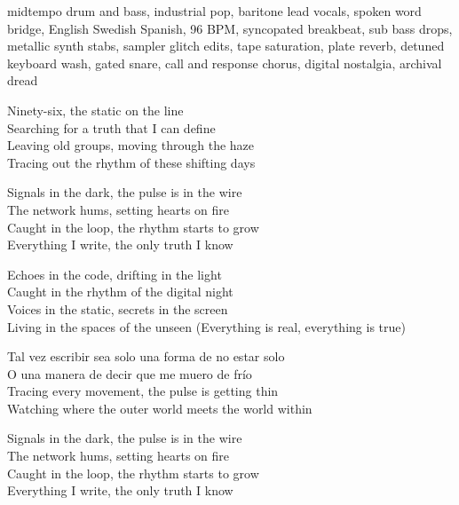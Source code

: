 

\begin{notes}
\end{notes}

\begin{style}
midtempo drum and bass, industrial pop, baritone lead vocals, spoken word bridge, English Swedish Spanish, 96 BPM, syncopated breakbeat, sub bass drops, metallic synth stabs, sampler glitch edits, tape saturation, plate reverb, detuned keyboard wash, gated snare, call and response chorus, digital nostalgia, archival dread
\end{style}

\begin{lyrics}
Ninety-six, the static on the line\\
Searching for a truth that I can define\\
Leaving old groups, moving through the haze\\
Tracing out the rhythm of these shifting days

Signals in the dark, the pulse is in the wire\\
The network hums, setting hearts on fire\\
Caught in the loop, the rhythm starts to grow\\
Everything I write, the only truth I know

Echoes in the code, drifting in the light\\
Caught in the rhythm of the digital night\\
Voices in the static, secrets in the screen\\
Living in the spaces of the unseen
(Everything is real, everything is true)

Tal vez escribir sea solo una forma de no estar solo\\
O una manera de decir que me muero de frío\\
Tracing every movement, the pulse is getting thin\\
Watching where the outer world meets the world within

Signals in the dark, the pulse is in the wire\\
The network hums, setting hearts on fire\\
Caught in the loop, the rhythm starts to grow\\
Everything I write, the only truth I know


\end{lyrics}

